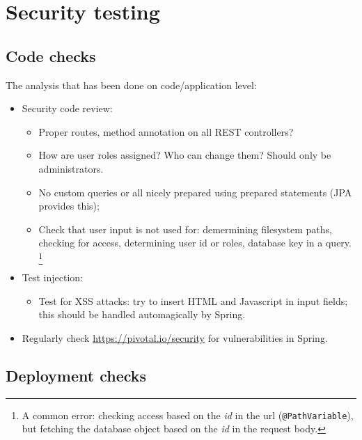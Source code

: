 \documentclass[a4paper]{report}
\begin{document}
\section{Security testing}\label{section:testing}

\subsection{Code checks}

The analysis that has been done on code/application level:
\begin{itemize}
\item Security code review:
\begin{itemize}
\item Proper routes, method annotation on all REST controllers?
\item How are user roles assigned? Who can change them? Should only be administrators.
\item No custom queries or all nicely prepared using prepared statements
(JPA provides this);
\item Check that user input is not used for:
demermining filesystem paths, checking for access, determining user id or roles,
database key in a query.%
\footnote{A common error: checking access based on the \emph{id} in the url
(\texttt{@PathVariable}),
but fetching the database object based on the \emph{id} in the request body.}
\end{itemize}
\item Test injection:
\begin{itemize}
\item Test for XSS attacks: try to insert HTML and Javascript in input fields;
this should be handled automagically by Spring.
\end{itemize}
\item Regularly check \url{https://pivotal.io/security} for vulnerabilities in Spring.
\end{itemize}


\subsection{Deployment checks}
\end{document}
